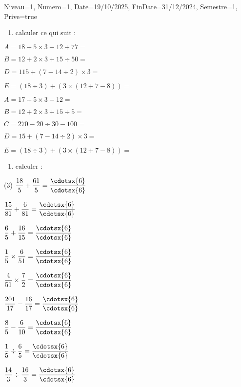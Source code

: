 \documentclass[a4paper,12pt]{article}
\begin{document}
\begin{Maquette}[DM]{Niveau=1, Numero=1, Date=19/10/2025, FinDate=31/12/2024, Semestre=1, Prive=true}

\begin{exercice}
\begin{enumerate}
\item calculer ce qui suit :
\end{enumerate}	
\begin{multicols}{2}	
  $ A=18+5\times 3-12+77=$
  \anserline[3]

$ B=12+2\times 3+15\div 50=$\anserline[3]

$ D=115+(7-14\div 2)\times 3=$\anserline[3]

$ E=(18\div 3)+(3\times(12+7-8))=$\anserline[3]\columnbreak
		
$ A=17+5\times 3-12=$\anserline[3]

$ B=12+2\times 3+15\div 5=$\anserline[3]

$ C=270-20\div 30-100=$\anserline[3]

$ D=15+(7-14\div 2)\times 3=$\anserline[3]

$ E=(18\div 3)+(3\times(12+7-8))=$\anserline[3]
	\end{multicols}
\end{exercice}

\begin{exercice}
	\begin{enumerate}[font=\bfseries]
		\item calculer :
		\end{enumerate}
\begin{tasks}(3)
\task\(\dfrac{18}{5}+\dfrac{61}{5}=\dfrac{\cdotsx{6}}{\cdotsx{6}}\)

\task\(\dfrac{15}{81}+\dfrac{6}{81}=\dfrac{\cdotsx{6}}{\cdotsx{6}}\)

\task\(\dfrac{6}{5}+\dfrac{16}{15}=\dfrac{\cdotsx{6}}{\cdotsx{6}}\)

\task\(\dfrac{1}{5}\times \dfrac{6}{51}=\dfrac{\cdotsx{6}}{\cdotsx{6}}\)

\task\(\dfrac{4}{51}\times\dfrac{7}{2}=\dfrac{\cdotsx{6}}{\cdotsx{6}}\)

\task\(\dfrac{201}{17}-\dfrac{16}{17}=\dfrac{\cdotsx{6}}{\cdotsx{6}}\)

\task\(\dfrac{8}{5}-\dfrac{6}{10}=\dfrac{\cdotsx{6}}{\cdotsx{6}}\)

\task\(\dfrac{1}{5}\div\dfrac{6}{5}=\dfrac{\cdotsx{6}}{\cdotsx{6}}\)

\task\(\dfrac{14}{3}\div\dfrac{16}{3}=\dfrac{\cdotsx{6}}{\cdotsx{6}}\)	
\end{tasks}
\vspace{10pt}	
\end{exercice}


\end{Maquette}
\end{document}
